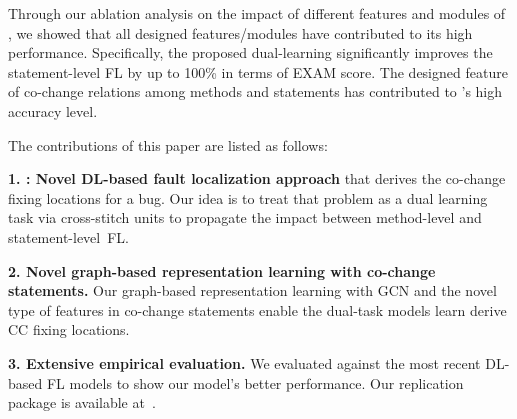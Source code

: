 Through our ablation analysis on the impact of different features and
modules of {\tool}, we showed that all designed features/modules have
contributed to its high performance. Specifically, the proposed
dual-learning significantly improves the statement-level FL by up to
100\% in terms of EXAM score. The designed feature of co-change
relations among methods and statements has contributed to {\tool}'s
high accuracy level.





The contributions of this paper are listed as follows:

{\bf 1. {\tool}: Novel DL-based fault localization approach} that
derives the co-change fixing locations for a bug. Our idea is to treat
that problem as a dual learning task via cross-stitch units to
propagate the impact between method-level and statement-level~FL.


{\bf 2. Novel graph-based representation learning with co-change
  statements.} Our graph-based representation learning with GCN
and the novel type of features in co-change statements enable
the dual-task models learn derive CC fixing locations.

{\bf 3. Extensive empirical evaluation.} We evaluated {\tool} against
the most recent DL-based FL models to show our model's better
performance. Our replication package is available
at~\cite{FixLocator2022}.

